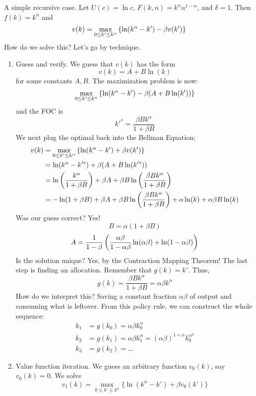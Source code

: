 \documentclass[10pt]{article}
\begin{document}
\begin{example}
	A simple recursive case. Let $U(c) = \ln{c}$, $F(k,n) = k^\alpha n^{1-\alpha}$, and $\delta = 1$. Then $f(k) = k^\alpha$ and
	\[
	v(k) = \max_{0 \le k' \le k^\alpha} \left\{ \ln(k^\alpha - k') - \beta v(k') \right\}
	\]
	How do we solve this? Let's go by technique.
	\begin{enumerate}
		\item Guess and verify. We guess that $v(k)$ has the form
		\[
		v(k) = A + B \ln(k)
		\]
		for some constants $A,B$. The maximization problem is now:
		\[
		\max_{0 \le k' \le k^\alpha} \left\{ \ln(k^\alpha - k') - \beta (A + B \ln(k')) \right\}
		\]
		and the FOC is
		\[
		k'^* = \frac{\beta B k^\alpha}{1 + \beta B}
		\]
		We next plug the optimal back into the Bellman Equation:
		\begin{align*}
			v(k) &= \max_{0 \le k' \le k^\alpha} \left\{ \ln(k^\alpha - k') + \beta v(k') \right\} \\
			&= \ln(k^\alpha - k'^*) + \beta (A + B \ln(k'^*)) \\
			&= \ln\left( \frac{k^\alpha}{1 + \beta B} \right) + \beta A + \beta B \ln \left( \frac{\beta B k^\alpha}{1 + \beta B} \right)  \\
			&= -\ln(1 + \beta B) + \beta A + \beta B \ln \left( \frac{\beta B k^\alpha}{1 + \beta B} \right)  + \alpha \ln(k) + \alpha \beta B \ln(k)
		\end{align*}
		Was our guess correct? Yes! 
		\[
		B = \alpha(1 + \beta B)
		\]
		\[
		A = \frac{1}{1-\beta} \left( \frac{\alpha \beta }{1 - \alpha \beta} \ln(\alpha \beta) + \ln(1 - \alpha \beta) \right)
		\]
		Is the solution unique? Yes, by the Contraction Mapping Theorem! The last step is finding an allocation. Remember that $g(k) = k'$. Thus,
		\[
		g(k) = \frac{\beta B k^\alpha}{1 + \beta B} = \alpha \beta k^\alpha
		\]
		How do we interpret this? Saving a constant fraction $\alpha \beta$ of output and consuming what is leftover. From this policy rule, we can construct the whole sequence:
		\begin{align*}
			k_1 &= g(k_0) = \alpha \beta k_0^\alpha \\
			k_2 &= g(k_1) = \alpha \beta k_1^\alpha = (\alpha \beta)^{1 + \alpha} k_0^{\alpha^2} \\
			k_3 &= g(k_2) = \dots
		\end{align*}
		\item Value function iteration. We guess an arbitrary function $v_0(k)$, say $v_0(k) = 0$. We solve
		\[
		v_1(k) = \max_{0 \le k' \le k^\alpha} \{\ln(k^\alpha - k') + \beta v_0(k')\}
\]
\end{enumerate}
\end{example}
\end{document}
